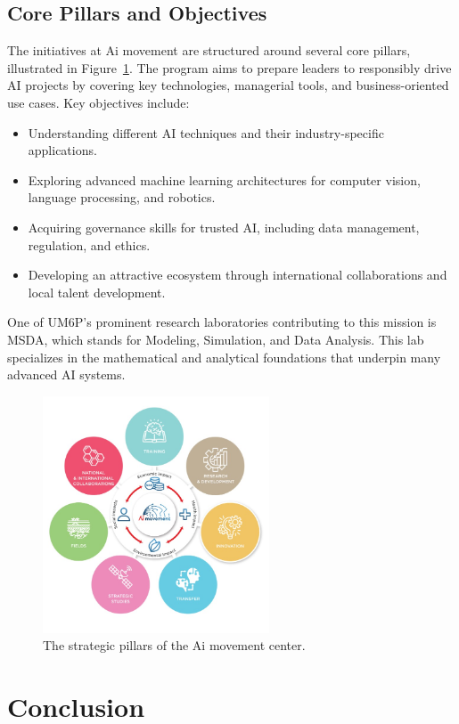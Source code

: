 \documentclass[../Main.tex]{subfiles}
\begin{document}
\subsection{Core Pillars and Objectives}
The initiatives at Ai movement are structured around several core pillars, illustrated in Figure~\ref{fig:aim_pillars}. The program aims to prepare leaders to responsibly drive AI projects by covering key technologies, managerial tools, and business-oriented use cases. Key objectives include:
\begin{itemize}
    \item Understanding different AI techniques and their industry-specific applications.
    \item Exploring advanced machine learning architectures for computer vision, language processing, and robotics.
    \item Acquiring governance skills for trusted AI, including data management, regulation, and ethics.
    \item Developing an attractive ecosystem through international collaborations and local talent development.
\end{itemize}
One of UM6P’s prominent research laboratories contributing to this mission is MSDA, which stands for Modeling, Simulation, and Data Analysis. This lab specializes in the mathematical and analytical foundations that underpin many advanced AI systems.

\begin{figure}[H]
    \centering
    \includegraphics[width=0.6\textwidth]{img/aim-pillars.jpeg}
    \caption{The strategic pillars of the Ai movement center.}
    \label{fig:aim_pillars}
\end{figure}

\section*{Conclusion}
\end{document}
